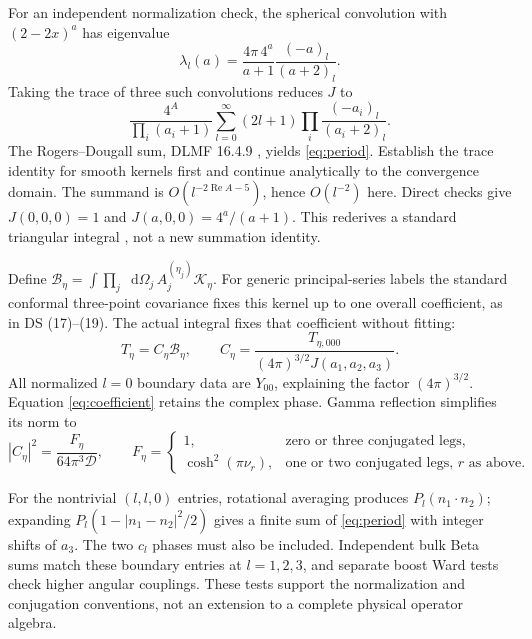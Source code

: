 \documentclass[11pt,a4paper]{article}
\newcommand{\dd}{\mathop{}\!\mathrm d}
\newcommand{\cD}{\mathcal D}
\begin{document}
For an independent normalization check, the spherical convolution
with $(2-2x)^a$ has eigenvalue
\begin{equation}
 \lambda_l(a)=\frac{4\pi\,4^a}{a+1}\frac{(-a)_l}{(a+2)_l}.
\end{equation}
Taking the trace of three such convolutions reduces $J$ to
\begin{equation}
 \frac{4^A}{\prod_i(a_i+1)}
 \sum_{l=0}^{\infty}(2l+1)
       \prod_i\frac{(-a_i)_l}{(a_i+2)_l}.
\end{equation}
The Rogers--Dougall sum, DLMF 16.4.9 \cite{dlmf}, yields
\eqref{eq:period}. Establish the trace identity for smooth kernels
first and continue analytically to the convergence domain.
The summand is $O(l^{-2\operatorname{Re}A-5})$, hence $O(l^{-2})$
here. Direct checks give $J(0,0,0)=1$ and
$J(a,0,0)=4^a/(a+1)$. This rederives a standard triangular integral
\cite{begmp}, not a new summation identity.

Define
$\mathcal B_\eta=\int\prod_j\dd\Omega_j\,A_j^{(\eta_j)}
\mathcal K_\eta$.
For generic principal-series labels the standard conformal
three-point covariance fixes this kernel up to one overall
coefficient, as in DS (17)--(19).
The actual integral fixes that coefficient without fitting:
\begin{equation}
 \boxed{\quad T_\eta=C_\eta\mathcal B_\eta,\qquad
 C_\eta=\frac{T_{\eta,000}}{(4\pi)^{3/2}J(a_1,a_2,a_3)}.\quad}
 \label{eq:coefficient}
\end{equation}
All normalized $l=0$ boundary data are $Y_{00}$, explaining the
factor $(4\pi)^{3/2}$. Equation \eqref{eq:coefficient} retains the
complex phase. Gamma reflection simplifies its norm to
\begin{equation}
 |C_\eta|^2=\frac{F_\eta}{64\pi^3\cD},\qquad
 F_\eta=
 \begin{cases}
 1,&\text{zero or three conjugated legs},\\
 \cosh^2(\pi\nu_r),&\text{one or two conjugated legs, $r$ as above}.
 \end{cases}
 \label{eq:norm}
\end{equation}

For the nontrivial $(l,l,0)$ entries, rotational averaging produces
$P_l(n_1\cdot n_2)$; expanding $P_l(1-|n_1-n_2|^2/2)$ gives a
finite sum of \eqref{eq:period} with integer shifts of $a_3$.
The two $c_l$ phases must also be included.
Independent bulk Beta sums match these boundary entries at
$l=1,2,3$, and separate boost Ward tests check higher angular
couplings. These tests support the normalization and conjugation
conventions, not an extension to a complete physical operator algebra.
\end{document}
